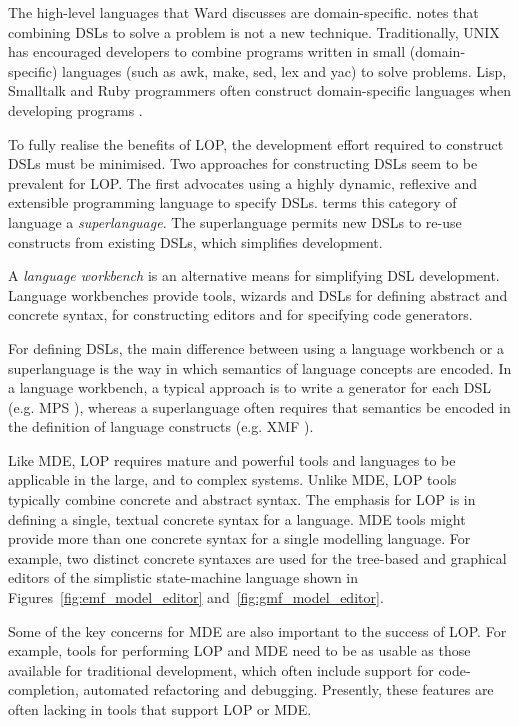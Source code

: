 The high-level languages that Ward discusses are domain-specific. \cite{fowler05language} notes that combining DSLs to solve a problem is not a new technique. Traditionally, UNIX has encouraged developers to combine programs written in small (domain-specific) languages (such as awk, make, sed, lex and yac) to solve problems. Lisp, Smalltalk and Ruby programmers often construct domain-specific languages when developing programs \cite{graham93lisp,fowler05language}.

To fully realise the benefits of LOP, the development effort required to construct DSLs must be minimised. Two approaches for constructing DSLs seem to be prevalent for LOP. The first advocates using a highly dynamic, reflexive and extensible programming language to specify DSLs. \cite{clark08superlanguages} terms this category of language a \textit{superlanguage}. The superlanguage permits new DSLs to re-use constructs from existing DSLs, which simplifies development.

A \textit{language workbench} \cite{fowler05language} is an alternative means for simplifying DSL development. Language workbenches provide tools, wizards and DSLs for defining abstract and concrete syntax, for constructing editors and for specifying code generators.

For defining DSLs, the main difference between using a language workbench or a superlanguage is the way in which semantics of language concepts are encoded. In a language workbench, a typical approach is to write a generator for each DSL (e.g. MPS \cite{mps}), whereas a superlanguage often requires that semantics be encoded in the definition of language constructs (e.g. XMF \cite{xmf}).

Like MDE, LOP requires mature and powerful tools and languages to be applicable in the large, and to complex systems. Unlike MDE, LOP tools typically combine concrete and abstract syntax. The emphasis for LOP is in defining a single, textual concrete syntax for a language. MDE tools might provide more than one concrete syntax for a single modelling language. For example, two distinct concrete syntaxes are used for the tree-based and graphical editors of the simplistic state-machine language shown in Figures~\ref{fig:emf_model_editor} and~\ref{fig:gmf_model_editor}.

Some of the key concerns for MDE are also important to the success of LOP. For example, tools for performing LOP and MDE need to be as usable as those available for traditional development, which often include support for code-completion, automated refactoring and debugging. Presently, these features are often lacking in tools that support LOP or MDE.

